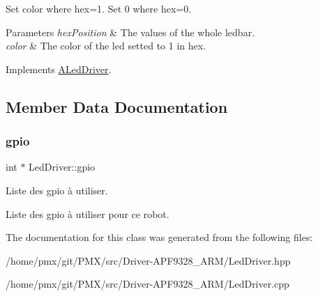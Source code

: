 Set color where hex=1. Set 0 where hex=0. 


\begin{DoxyParams}{Parameters}
{\em hex\+Position} & The values of the whole ledbar. \\
\hline
{\em color} & The color of the led setted to 1 in hex. \\
\hline
\end{DoxyParams}


Implements \hyperlink{classALedDriver_a3a219f7546870d4bce0ae36cad3b0518}{A\+Led\+Driver}.



\subsection{Member Data Documentation}
\mbox{\label{classLedDriver_adaaa4082a4a290b5f1991c834ee207bd}} 
\subsubsection{\texorpdfstring{gpio}{gpio}}
{\footnotesize\ttfamily int $\ast$ Led\+Driver\+::gpio}



Liste des gpio à utiliser. 

Liste des gpio à utiliser pour ce robot. 

The documentation for this class was generated from the following files\+:\begin{DoxyCompactItemize}
\item 
/home/pmx/git/\+P\+M\+X/src/\+Driver-\/\+A\+P\+F9328\+\_\+\+A\+R\+M/Led\+Driver.\+hpp\item 
/home/pmx/git/\+P\+M\+X/src/\+Driver-\/\+A\+P\+F9328\+\_\+\+A\+R\+M/Led\+Driver.\+cpp\end{DoxyCompactItemize}
